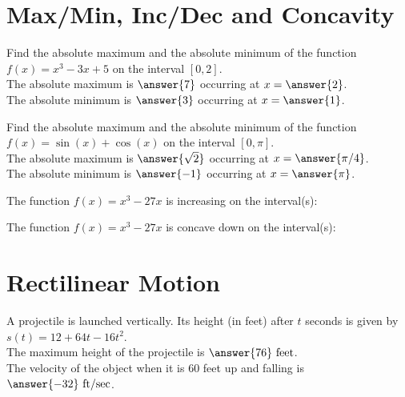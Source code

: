 \documentclass{ximera}
\begin{document}
\section{Max/Min, Inc/Dec and Concavity}

\begin{problem}
Find the absolute maximum and the absolute minimum of the function $f(x) = x^3 - 3x+ 5$
on the interval $[0, 2]$.\\
The absolute maximum is $\answer{7}$ occurring at $x = \answer{2}$.\\
The absolute minimum is $\answer{3}$ occurring at $x = \answer{1}$.\\
\end{problem}

\begin{problem}
Find the absolute maximum and the absolute minimum of the function $f(x) = \sin(x) + \cos(x)$
on the interval $[0, \pi]$.\\
The absolute maximum is $\answer{\sqrt 2}$ occurring at $x = \answer{\pi/4}$.\\
The absolute minimum is $\answer{-1}$ occurring at $x = \answer{\pi}$.
\end{problem}


\begin{problem}
The function $f(x) = x^3 - 27x$ is increasing on the interval(s):
\begin{multipleChoice}
\end{multipleChoice}
\end{problem}


\begin{problem}
The function $f(x) = x^3 - 27x$ is concave down on the interval(s):
\begin{multipleChoice}
\end{multipleChoice}
\end{problem}


\section{Rectilinear Motion}

\begin{problem}
A projectile is launched vertically.  Its height (in feet) after $t$ seconds is given by
$s(t) = 12 + 64t -16t^2$.\\

The maximum height of the projectile is $\answer{76} \ \text{feet}$.\\
The velocity of the object when it is $60$ feet up and falling is $\answer{-32} \ \text{ft/sec}$.
\end{problem}
\end{document}
